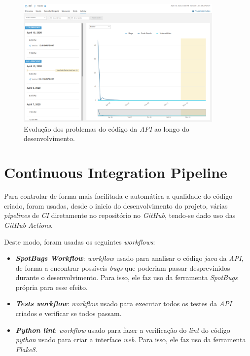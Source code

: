 \begin{figure}[h]
   \centering
   \includegraphics[width=0.90\textwidth]{images/sonar_activity}
   \caption{Evolução dos problemas do código da \textit{API} ao longo do desenvolvimento.}
   \label{fig:sonar_activity}
\end{figure}


\section{Continuous Integration Pipeline}
Para controlar de forma mais facilitada e automática a qualidade do código criado, foram usadas, desde o inicio do desenvolvimento do projeto, várias \textit{pipelines} de \textit{CI} diretamente no repositório no \textit{GitHub}, tendo-se dado uso das \textit{GitHub Actions}.

Deste modo, foram usadas os seguintes \textit{workflows}:
\begin{itemize}
   \item \textbf{\textit{SpotBugs Workflow}}: \textit{workflow} usado para analisar o código \textit{java} da \textit{API}, de forma a encontrar possíveis \textit{bugs} que poderiam passar desprevinidos durante o desenvolvimento. Para isso, ele faz uso da ferramenta \textit{SpotBugs} própria para esse efeito.
   \item \textbf{\textit{Tests workflow}}: \textit{workflow} usado para executar todos os testes da \textit{API} criados e verificar se todos passam.
   \item \textbf{\textit{Python lint}}: \textit{workflow} usado para fazer a verificação do \textit{lint} do código \textit{python} usado para criar a interface \textit{web}. Para isso, ele faz uso da ferramenta \textit{Flake8}.
\end{itemize}

